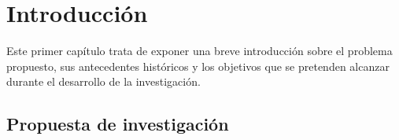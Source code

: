 
\chapter{Introducción} \label{cap1}

Este primer capítulo trata de exponer una breve introducción sobre el problema propuesto, sus antecedentes históricos y los objetivos que se pretenden alcanzar durante el desarrollo de la investigación.

\newpage

\section{Propuesta de investigación} \label{s1_1}


